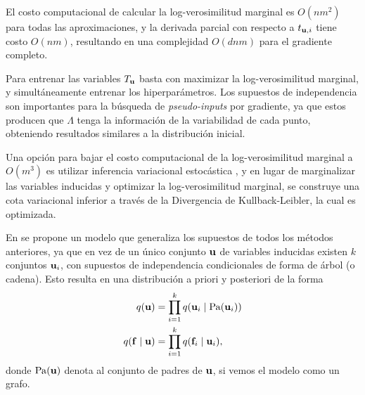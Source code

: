 \begin{proposition}
	El costo computacional de calcular la log-verosimilitud marginal es \(O(nm^{2})\) para todas las aproximaciones, y la derivada parcial con respecto a \(t_{\mathbf{u}, i}\) tiene costo \(O(nm)\), resultando en una complejidad \(O(dnm)\) para el gradiente completo.
\end{proposition}

Para entrenar las variables \(T_{\mathbf{u}}\) basta con maximizar la log-verosimilitud marginal, y simultáneamente entrenar los hiperparámetros. Los supuestos de independencia son importantes para la búsqueda de \emph{pseudo-inputs} por gradiente, ya que estos producen que \(\Lambda\) tenga la información de la variabilidad de cada punto, obteniendo resultados similares a la distribución inicial.

Una opción para bajar el costo computacional de la log-verosimilitud marginal a \(O(m^{3})\) es utilizar inferencia variacional estocástica \cite{23}, y en lugar de marginalizar las variables inducidas y optimizar la log-verosimilitud marginal, se construye una cota variacional inferior a través de la Divergencia de Kullback-Leibler, la cual es optimizada.

En \cite{20} se propone un modelo que generaliza los supuestos de todos los métodos anteriores, ya que en vez de un único conjunto \(\mathbf{u}\) de variables inducidas existen \(k\) conjuntos \(\mathbf{u}_{i}\), con supuestos de independencia condicionales de forma de árbol (o cadena). Esto resulta en una distribución a priori y posteriori de la forma
\begin{align*}
	q(\mathbf{u})				&= \prod_{i=1}^{k} q(\mathbf{u}_{i} \mid \mathrm{Pa}(\mathbf{u}_{i})) \\
	q(\mathbf{f} \mid \mathbf{u})	&= \prod_{i=1}^{k} q(\mathbf{f}_{i} \mid \mathbf{u}_{i}),
\end{align*}
donde \(\mathrm{Pa}(\mathbf{u})\) denota al conjunto de padres de \(\mathbf{u}\), si vemos el modelo como un grafo.


